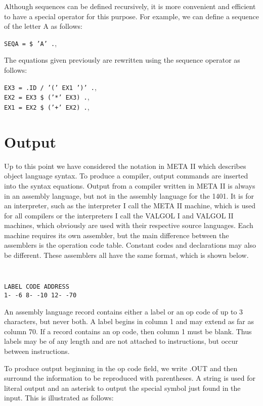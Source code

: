 \documentclass[twocolumn]{article}
\begin{document}
Although sequences can be defined recursively, it is more convenient and
efficient to have a special operator for this purpose.
For example, we can define a sequence of the letter A as follows:

\begin{center}
{\tt SEQA = \$ 'A' .},
\end{center}

The equations given previously are rewritten using the sequence operator
as follows:

\begin{center}
{\tt EX3 = .ID / '(' EX1 ')' .}, \\
{\tt EX2 = EX3 \$ ('*' EX3) .}, \\
{\tt EX1 = EX2 \$ ('+' EX2) .},
\end{center}

\section{Output}

Up to this point we have considered the notation in META II which describes
object language syntax. To produce a compiler, output commands are inserted
into the syntax equations.
Output from a compiler written in META II is always in an assembly language,
but not in the assembly language for the 1401.
It is for an interpreter, such as the interpreter I call the META II machine,
which is used for all compilers or the interpreters I call the VALGOL I and
VALGOL II machines, which obviously are used with their respective source
languages.
Each machine requires its own assembler, but the main difference between the
assemblers is the operation code table.
Constant codes and declarations may also be different.
These assemblers all have the same format, which is shown below.

{\tt
\begin{verbatim}
LABEL CODE ADDRESS
1- -6 8- -10 12- -70
\end{verbatim}
}

An assembly language record contains either a label or an op code of up to
3 characters, but never both.
A label begins in column 1 and may extend as far as column 70.
If a record contains an op code, then column 1 must be blank.
Thus labels may be of any length and are not attached to instructions, but
occur between instructions.

To produce output beginning in the op code field, we write .OUT and then
surround the information to be reproduced with parentheses.
A string is used for literal output and an asterisk to output the special
symbol just found in the input. This is illustrated as follows:
\end{document}
